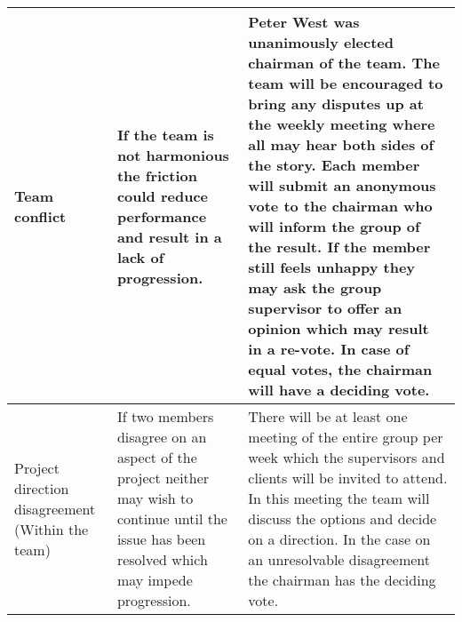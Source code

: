 \begin{center}
\begin{landscape}
\begin{longtable}{>{\raggedright}p{3cm}  >{\raggedright}p{7cm}  p{12cm}}
        Team conflict                                    & If the team is not harmonious the friction could reduce performance and result in a lack of progression.                                                                                                                                                                                                                                                                     & Peter West was unanimously elected chairman of the team. The team will be encouraged to bring any disputes up at the weekly meeting where all may hear both sides of the story. Each member will submit an anonymous vote to the chairman who will inform the group of the result. If the member still feels unhappy they may ask the group supervisor to offer an opinion which may result in a re-vote. In case of equal votes, the chairman will have a deciding vote.                                                                                                                                                                                                                                                                                                                                                                                                                                                                                                                                                                \\ \midrule
        Project direction disagreement (Within the team) & If two members disagree on an aspect of the project neither may wish to continue until the issue has been resolved which may impede progression.                                                                                                                                                                                                                             & There will be at least one meeting of the entire group per week which the supervisors and clients will be invited to attend. In this meeting the team will discuss the options and decide on a direction. In the case on an unresolvable disagreement the chairman has the deciding vote.                                                                                                                                                                                                                                                                                                                                                                                                                                                                                                                                                                                                                                                                                                                                                \\ \midrule

\end{longtable}
\end{landscape}
\end{center}
